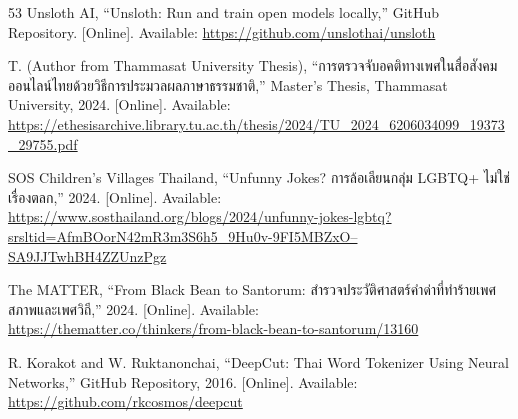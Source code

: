 \documentclass[12pt,oneside,openright,a4paper]{cpe-english-project}
\begin{document}
\begin{thebibliography}{53}
\hypertarget{bib:ref49}{} Unsloth AI, ``Unsloth: Run and train open models locally,''
GitHub Repository. {[}Online{]}. Available:
\url{https://github.com/unslothai/unsloth}

\hypertarget{bib:ref50}{} T. (Author from Thammasat University Thesis),
``การตรวจจับอคติทางเพศในสื่อสังคมออนไลน์ไทยด้วยวิธีการประมวลผลภาษาธรรมชาติ,''
Master's Thesis, Thammasat University, 2024. {[}Online{]}. Available:\\
\url{https://ethesisarchive.library.tu.ac.th/thesis/2024/TU_2024_6206034099_19373_29755.pdf}

\hypertarget{bib:ref51}{} SOS Children's Villages Thailand, ``Unfunny Jokes? การล้อเลียนกลุ่ม
LGBTQ+ ไม่ใช่เรื่องตลก,'' 2024. {[}Online{]}. Available:\\
\href{https://www.sosthailand.org/blogs/2024/unfunny-jokes-lgbtq?srsltid=AfmBOorN42mR3m3S6h5_9Hu0v-9FI5MBZxO--SA9JJTwhBH4ZZUnzPgz}{https://www.sosthailand.org/blogs/2024/unfunny-jokes-lgbtq?srsltid=AfmBOorN42mR3m3S6h5\_9Hu0v-9FI5MBZxO--SA9JJTwhBH4ZZUnzPgz}

\hypertarget{bib:ref52}{} The MATTER, ``From Black Bean to Santorum:
สำรวจประวัติศาสตร์คำด่าที่ทำร้ายเพศสภาพและเพศวิถี,'' 2024. {[}Online{]}.
Available:\\
\url{https://thematter.co/thinkers/from-black-bean-to-santorum/13160}

\hypertarget{bib:ref53}{} R. Korakot and W. Ruktanonchai, ``DeepCut: Thai Word Tokenizer
Using Neural Networks,'' GitHub Repository, 2016. {[}Online{]}.
Available: \url{https://github.com/rkcosmos/deepcut}

\end{thebibliography}
\end{document}
